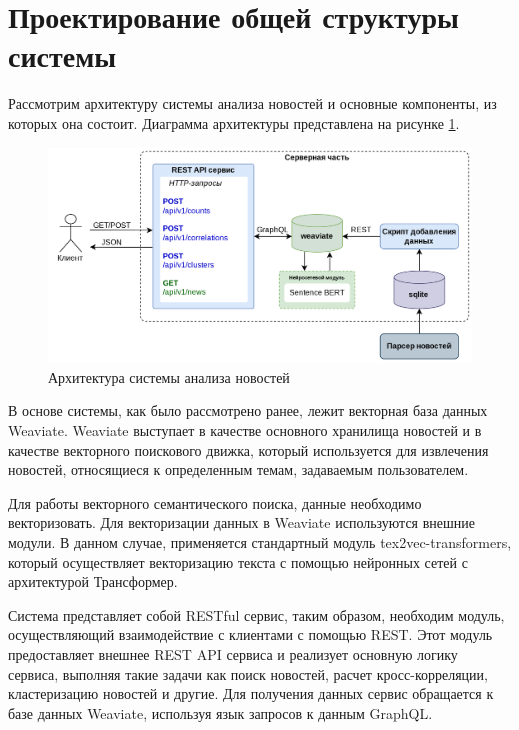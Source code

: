 \section{Проектирование общей структуры системы}

Рассмотрим архитектуру системы анализа новостей и основные компоненты, из которых она состоит. Диаграмма архитектуры представлена на рисунке \ref{img:system-architecture}.

\begin{figure}[h]
    \centering
    \includegraphics[width=\linewidth]{images/system-architecture.png}
    \caption{Архитектура системы анализа новостей}
    \label{img:system-architecture}
\end{figure}

В основе системы, как было рассмотрено ранее, лежит векторная база данных Weaviate. Weaviate выступает в качестве основного хранилища новостей и в качестве векторного поискового движка, который используется для извлечения новостей, относящиеся к определенным темам, задаваемым пользователем.

Для работы векторного семантического поиска, данные необходимо векторизовать. Для векторизации данных в Weaviate используются внешние модули. В данном случае, применяется стандартный модуль tex2vec-transformers, который осуществляет векторизацию текста с помощью нейронных сетей с архитектурой Трансформер.

Система представляет собой RESTful сервис, таким образом, необходим модуль, осуществляющий взаимодействие с клиентами с помощью REST. Этот модуль предоставляет внешнее REST API сервиса и реализует основную логику сервиса, выполняя такие задачи как поиск новостей, расчет кросс-корреляции, кластеризацию новостей и другие. Для получения данных сервис обращается к базе данных Weaviate, используя язык запросов к данным GraphQL.


